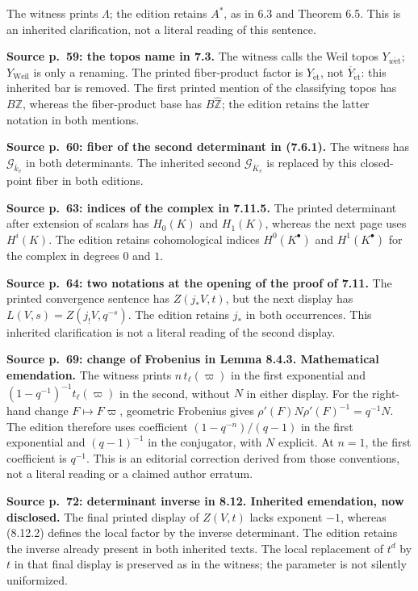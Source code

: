 \documentclass[10pt,letterpaper]{article}
\begin{document}
\begin{description}[style=nextline,leftmargin=2.6em,labelwidth=2.2em,font=\normalfont\bfseries]
The witness prints \(\Lambda\); the edition retains \(A^*\), as in 6.3 and Theorem 6.5.
This is an inherited clarification, not a literal reading of this sentence.
\item[E50] \textbf{Source p.~59: the topos name in 7.3.}
The witness calls the Weil topos \(Y_{w\mathrm{\acute et}}\); \(Y_{\mathrm{Weil}}\) is only a renaming.
The printed fiber-product factor is \(Y_{\mathrm{\acute et}}\), not \(\overline Y_{\mathrm{\acute et}}\): this inherited bar is removed.
The first printed mention of the classifying topos has \(B\mathbb Z\), whereas the fiber-product base has \(B\widehat{\mathbb Z}\); the edition retains the latter notation in both mentions.
\item[E51] \textbf{Source p.~60: fiber of the second determinant in (7.6.1).}
The witness has \(\mathcal G_{\overline k_v}\) in both determinants.
The inherited second \(\mathcal G_{\overline K_v}\) is replaced by this closed-point fiber in both editions.
\item[E52] \textbf{Source p.~63: indices of the complex in 7.11.5.}
The printed determinant after extension of scalars has \(H_0(K)\) and \(H_1(K)\), whereas the next page uses \(H^i(K)\).
The edition retains cohomological indices \(H^0(K^\bullet)\) and \(H^1(K^\bullet)\) for the complex in degrees \(0\) and \(1\).
\item[E53] \textbf{Source p.~64: two notations at the opening of the proof of 7.11.}
The printed convergence sentence has \(Z(j_*V,t)\), but the next display has \(L(V,s)=Z(j_!V,q^{-s})\).
The edition retains \(j_*\) in both occurrences. This inherited clarification is not a literal reading of the second display.
\item[E54] \textbf{Source p.~69: change of Frobenius in Lemma 8.4.3. Mathematical emendation.}
The witness prints \(n\,t_\ell(\varpi)\) in the first exponential and \((1-q^{-1})^{-1}t_\ell(\varpi)\) in the second, without \(N\) in either display. For the right-hand change \(F\mapsto F\varpi\), geometric Frobenius gives \(\rho'(F)N\rho'(F)^{-1}=q^{-1}N\). The edition therefore uses coefficient \((1-q^{-n})/(q-1)\) in the first exponential and \((q-1)^{-1}\) in the conjugator, with \(N\) explicit. At \(n=1\), the first coefficient is \(q^{-1}\). This is an editorial correction derived from those conventions, not a literal reading or a claimed author erratum.
\item[E55] \textbf{Source p.~72: determinant inverse in 8.12. Inherited emendation, now disclosed.}
The final printed display of \(Z(V,t)\) lacks exponent \(-1\), whereas (8.12.2) defines the local factor by the inverse determinant. The edition retains the inverse already present in both inherited texts. The local replacement of \(t^d\) by \(t\) in that final display is preserved as in the witness; the parameter is not silently uniformized.

\end{description}
\end{document}
